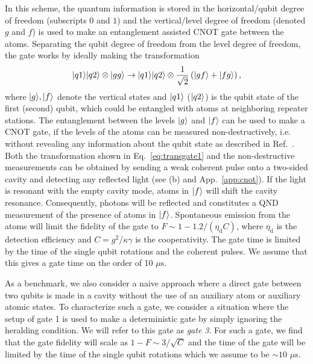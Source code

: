 In this scheme, the quantum information is stored in the horizontal/qubit degree
of freedom (subscripts $0$ and $1$) and the vertical/level degree of freedom
(denoted $g$ and $f$) is used to make an entanglement assisted CNOT gate between
the atoms. Separating the qubit degree of freedom from the level degree of
freedom, the gate works by ideally making the transformation
\begin{equation} \label{eq:transgate1}
| q1 \rangle| q2 \rangle\otimes| gg \rangle\to
| q1 \rangle| q2 \rangle\otimes\frac{1}{\sqrt{2}}\left(| gf \rangle+| fg \rangle\right),
\end{equation} 
where $| g \rangle,| f \rangle$ denote the vertical states and $| q1 \rangle$ ($| q2 \rangle$)
is the qubit state of the first (second) qubit, which could be entangled with
atoms at neighboring repeater stations. The entanglement between the levels
$| g \rangle$ and $| f \rangle$ can be used to make a CNOT gate, if the levels of the
atoms can be measured non-destructively, i.e. without revealing any information
about the qubit state as described in Ref.~\cite{Anders2prl}. Both the
transformation shown in Eq.~\eqref{eq:transgate1} and the non-destructive
measurements can be obtained by sending a weak coherent pulse onto a two-sided
cavity and detecting any reflected light (see (b) and
App.~\ref{app:cnot}). If the light is resonant with the empty cavity mode, atoms
in $| f \rangle$ will shift the cavity resonance. Consequently, photons will be
reflected and constitutes a QND measurement of the presence of atoms in
$| f \rangle$. Spontaneous emission from the atoms will limit the fidelity of the
gate to $F\sim1-1.2/(\eta_{\mathrm{d}}C)$, where $\eta_{\mathrm{d}}$ is the
detection efficiency and $C=g^{2}/\kappa\gamma$ is the cooperativity. The gate
time is limited by the time of the single qubit rotations and the coherent
pulses.  We assume that this gives a gate time on the order of 10 $\mu$s.

As a benchmark, we also consider a naive approach where a direct gate between
two qubits is made in a cavity without the use of an auxiliary atom or auxiliary
atomic states. To characterize such a gate, we consider a situation where the
setup of gate 1 is used to make a deterministic gate by simply ignoring the
heralding condition. We will refer to this gate as \emph{gate 3}. For such a
gate, we find that the gate fidelity will scale as $1-F\sim3/\sqrt{C}$ and the
time of the gate will be limited by the time of the single qubit rotations which
we assume to be $\sim10$ $\mu$s.

